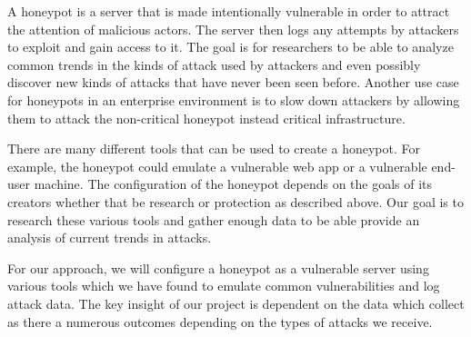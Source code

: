 A honeypot is a server that is made intentionally vulnerable in order to attract the attention of malicious actors. The server then logs any attempts by attackers to exploit and gain access to it. The goal is for researchers to be able to analyze common trends in the kinds of attack used by attackers and even possibly discover new kinds of attacks that have never been seen before. Another use case for honeypots in an enterprise environment is to slow down attackers by allowing them to attack the non-critical honeypot instead critical infrastructure. 

There are many different tools that can be used to create a honeypot. For example, the honeypot could emulate a vulnerable web app or a vulnerable end-user machine. The configuration of the honeypot depends on the goals of its creators whether that be research or protection as described above. Our goal is to research these various tools and gather enough data to be able provide an analysis of current trends in attacks.

For our approach, we will configure a honeypot as a vulnerable server using various tools which we have found to emulate common vulnerabilities and log attack data. The key insight of our project is dependent on the data which collect as there a numerous outcomes depending on the types of attacks we receive. 
